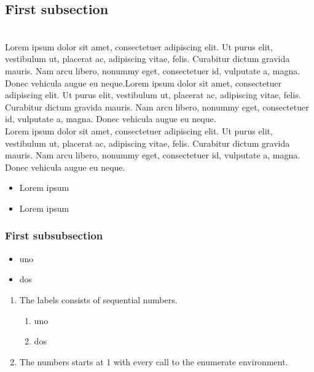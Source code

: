 \documentclass[12pt]{article}
\begin{document}
\subsection{First subsection}
\lipsum[1]\\
Lorem ipsum dolor sit amet, consectetuer adipiscing elit. Ut purus elit, vestibulum ut, placerat ac, adipiscing vitae, felis. Curabitur dictum gravida mauris. Nam arcu libero, nonummy eget, consectetuer id, vulputate a, magna. Donec vehicula augue eu neque.\sidenoteend Lorem ipsum dolor sit amet, consectetuer adipiscing elit. Ut purus elit, vestibulum ut, placerat ac, adipiscing vitae, felis. Curabitur dictum gravida mauris. Nam arcu libero, nonummy eget, consectetuer id, vulputate a, magna. Donec vehicula augue eu neque.\\
Lorem ipsum dolor sit amet, consectetuer adipiscing elit. Ut purus elit, vestibulum ut, placerat ac, adipiscing vitae, felis. Curabitur dictum gravida mauris. Nam arcu libero, nonummy eget, consectetuer id, vulputate a, magna. Donec vehicula augue eu neque.


\lipsum[1-2]

\rightboxbegin
\begin{itemize}
 \item Lorem ipsum
 \item Lorem ipsum
\end{itemize}
\rightboxend

\lipsum[1]

\subsubsection{First subsubsection}

\begin{itemize}
 \item uno
 \item dos
\end{itemize}

\begin{enumerate}
  \item The labels consists of sequential numbers.
  \begin{enumerate}
    \item uno
    \item dos
  \end{enumerate}
  \item The numbers starts at 1 with every call to the enumerate environment.
\end{enumerate}
\end{document}
